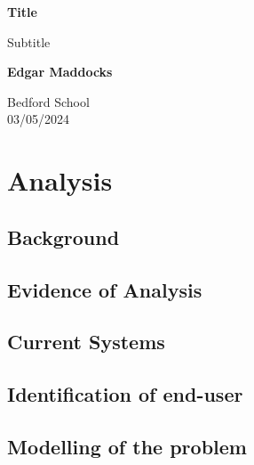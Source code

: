 \documentclass{article}
\begin{document}
\begin{titlepage}
    \begin{center}
        \vspace*{1cm}
            
        \Huge
        \textbf{Title}
            
        \vspace{0.5cm}
        \LARGE
        Subtitle
            
        \vspace{1.5cm}
            
        \textbf{Edgar Maddocks}
            
        \vfill
            
        \vspace{0.8cm}
                        
        \Large
        Bedford School\\
        03/05/2024\\
            
    \end{center}
\end{titlepage}

    \pagebreak

    \tableofcontents

    \section{Analysis}
    \subsection{Background}

    \subsection{Evidence of Analysis}

    \subsection{Current Systems}

    \subsection{Identification of end-user}

    \subsection{Modelling of the problem}
\end{document}
